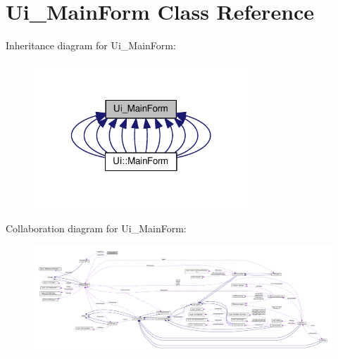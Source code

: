 \hypertarget{class_ui___main_form}{}\section{Ui\+\_\+\+Main\+Form Class Reference}
\label{class_ui___main_form}


Inheritance diagram for Ui\+\_\+\+Main\+Form\+:
\nopagebreak
\begin{figure}[H]
\begin{center}
\leavevmode
\includegraphics[width=229pt]{class_ui___main_form__inherit__graph}
\end{center}
\end{figure}


Collaboration diagram for Ui\+\_\+\+Main\+Form\+:\nopagebreak
\begin{figure}[H]
\begin{center}
\leavevmode
\includegraphics[width=350pt]{class_ui___main_form__coll__graph}
\end{center}
\end{figure}
